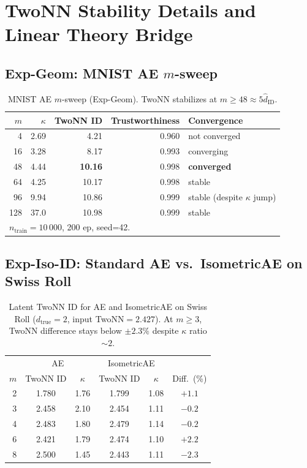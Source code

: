 \documentclass[make,article,submit,pdftex,moreauthors]{Definitions/mdpi}
\newcommand{\kap}{\kappa}
\newcommand{\hatdID}{\hat{d}_{\mathrm{ID}}}
\begin{document}
\section{TwoNN Stability Details and Linear Theory Bridge}
\label{app:twonn_detail}

\subsection{Exp-Geom: MNIST AE $m$-sweep}

\begin{table}[H]
\centering
\caption{MNIST AE $m$-sweep (Exp-Geom). TwoNN stabilizes at $m\geq48\approx5\hatdID$.}
\label{tab:eq_mnist}
\small
\begin{tabular}{rrrrl}
\toprule
$m$ & $\kap$ & TwoNN ID & Trustworthiness & Convergence \\
\midrule
 4  & 2.69 & 4.21 & 0.960 & not converged \\
16  & 3.28 & 8.17 & 0.993 & converging \\
48  & 4.44 & \textbf{10.16} & 0.998 & \textbf{converged} \\
64  & 4.25 & 10.17 & 0.998 & stable \\
96  & 9.94 & 10.86 & 0.999 & stable (despite $\kap$ jump) \\
128 & 37.0 & 10.98 & 0.999 & stable \\
\midrule
\multicolumn{5}{l}{\small $n_{\mathrm{train}}=10\,000$, 200 ep, seed=42.} \\
\bottomrule
\end{tabular}
\end{table}

\subsection{Exp-Iso-ID: Standard AE vs.\ IsometricAE on Swiss Roll}

\begin{table}[H]
\centering
\caption{Latent TwoNN ID for AE and IsometricAE on Swiss Roll
($d_{\mathrm{true}}=2$, input TwoNN$=2.427$).
At $m\geq3$, TwoNN difference stays below $\pm2.3\%$ despite $\kap$ ratio $\sim2$.}
\label{tab:iso_id}
\small
\begin{tabular}{r cc | cc | c}
\toprule
 & \multicolumn{2}{c|}{AE} & \multicolumn{2}{c|}{IsometricAE} & \\
$m$ & TwoNN ID & $\kap$ & TwoNN ID & $\kap$ & Diff.\ (\%) \\
\midrule
2 & 1.780 & 1.76 & 1.799 & 1.08 & $+1.1$ \\
3 & 2.458 & 2.10 & 2.454 & 1.11 & $-0.2$ \\
4 & 2.483 & 1.80 & 2.479 & 1.14 & $-0.2$ \\
6 & 2.421 & 1.79 & 2.474 & 1.10 & $+2.2$ \\
8 & 2.500 & 1.45 & 2.443 & 1.11 & $-2.3$ \\
\bottomrule
\end{tabular}
\end{table}
\end{document}
